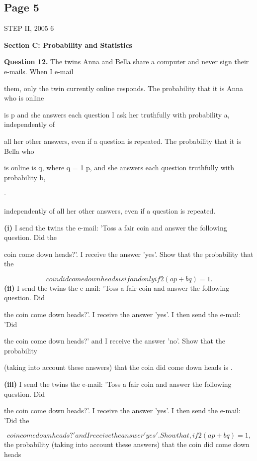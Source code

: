 \documentclass[12pt]{article}
\begin{document}
\subsection*{Page 5}
\begin{flushleft}
STEP II, 2005 6\par
\bigskip\textbf{Section C: Probability and Statistics}\par
\bigskip\textbf{Question 12.} The twins Anna and Bella share a computer and never sign their e-mails. When I e-mail\par
them, only the twin currently online responds. The probability that it is Anna who is online\par
is p and she answers each question I ask her truthfully with probability a, independently of\par
all her other answers, even if a question is repeated. The probability that it is Bella who\par
is online is q, where q = 1 p, and she answers each question truthfully with probability b,\par
-\par
independently of all her other answers, even if a question is repeated.\par
\textbf{(i)} I send the twins the e-mail: 'Toss a fair coin and answer the following question. Did the\par
coin come down heads?'. I receive the answer 'yes'. Show that the probability that the\par
\[coin did come down heads is if and only if 2(ap + bq) = 1.\]
\textbf{(ii)} I send the twins the e-mail: 'Toss a fair coin and answer the following question. Did\par
the coin come down heads?'. I receive the answer 'yes'. I then send the e-mail: 'Did\par
the coin come down heads?' and I receive the answer 'no'. Show that the probability\par
(taking into account these answers) that the coin did come down heads is .\par
\textbf{(iii)} I send the twins the e-mail: 'Toss a fair coin and answer the following question. Did\par
the coin come down heads?'. I receive the answer 'yes'. I then send the e-mail: 'Did the\par
\[coin come down heads?' and I receive the answer 'yes'. Show that, if 2(ap + bq) = 1,\]
the probability (taking into account these answers) that the coin did come down heads\par

\end{flushleft}
\end{document}
